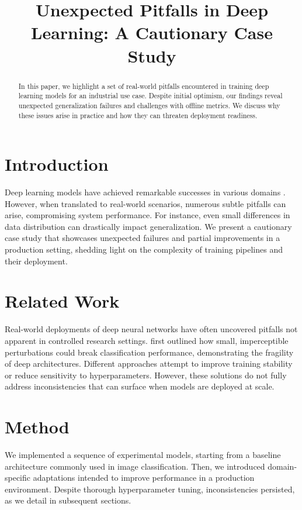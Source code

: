 \documentclass{article}
\title{Unexpected Pitfalls in Deep Learning: A Cautionary Case Study}
\date{}
\begin{document}
\maketitle

\begin{abstract}
In this paper, we highlight a set of real-world pitfalls encountered in training deep learning models for an industrial use case. Despite initial optimism, our findings reveal unexpected generalization failures and challenges with offline metrics. We discuss why these issues arise in practice and how they can threaten deployment readiness.
\end{abstract}

\section{Introduction}
Deep learning models have achieved remarkable successes in various domains \cite{kingma2014adam,smith2019superconvergence,zhang2019cyclical}. However, when translated to real-world scenarios, numerous subtle pitfalls can arise, compromising system performance. For instance, even small differences in data distribution can drastically impact generalization. We present a cautionary case study that showcases unexpected failures and partial improvements in a production setting, shedding light on the complexity of training pipelines and their deployment.

\section{Related Work}
Real-world deployments of deep neural networks have often uncovered pitfalls not apparent in controlled research settings. \cite{goodfellow2015adversarial} first outlined how small, imperceptible perturbations could break classification performance, demonstrating the fragility of deep architectures. Different approaches \cite{kingma2014adam,zhang2019cyclical} attempt to improve training stability or reduce sensitivity to hyperparameters. However, these solutions do not fully address inconsistencies that can surface when models are deployed at scale.

\section{Method}
We implemented a sequence of experimental models, starting from a baseline architecture commonly used in image classification. Then, we introduced domain-specific adaptations intended to improve performance in a production environment. Despite thorough hyperparameter tuning, inconsistencies persisted, as we detail in subsequent sections.
\end{document}
